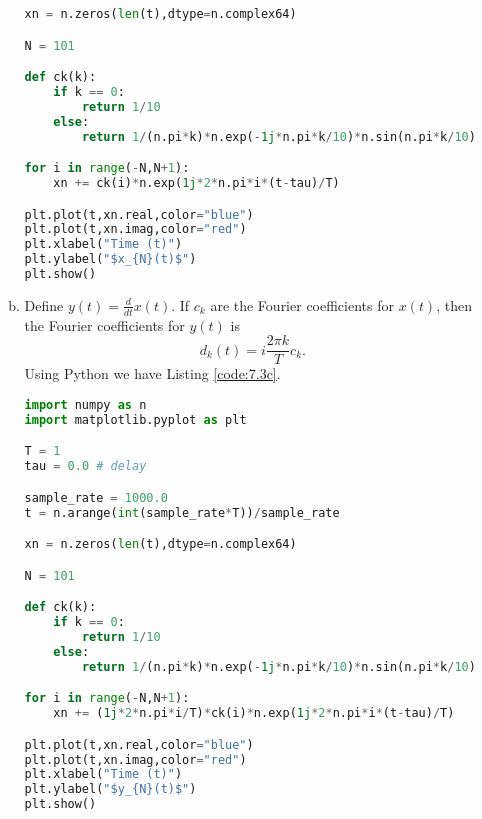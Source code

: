 \begin{enumerate}
\begin{enumerate}[a)]
\begin{lstlisting}[language=Python, caption=Suggested solution to b),label=code:7.3b]
xn = n.zeros(len(t),dtype=n.complex64)

N = 101

def ck(k):
    if k == 0:
        return 1/10
    else:
        return 1/(n.pi*k)*n.exp(-1j*n.pi*k/10)*n.sin(n.pi*k/10)

for i in range(-N,N+1):
    xn += ck(i)*n.exp(1j*2*n.pi*i*(t-tau)/T)

plt.plot(t,xn.real,color="blue")
plt.plot(t,xn.imag,color="red")
plt.xlabel("Time (t)")
plt.ylabel("$x_{N}(t)$")
plt.show()
\end{lstlisting}

\item Define $y(t)=\frac{d}{dt}x(t)$. If $c_{k}$ are the Fourier coefficients for $x(t)$, then the Fourier coefficients for $y(t)$ is
$$d_{k}(t)=i \frac{2\pi k}{T}c_{k}.$$
Using Python we have Listing \ref{code:7.3c}.
\begin{lstlisting}[language=Python, caption=Suggested solution to c),label=code:7.3c]
import numpy as n
import matplotlib.pyplot as plt

T = 1
tau = 0.0 # delay

sample_rate = 1000.0
t = n.arange(int(sample_rate*T))/sample_rate

xn = n.zeros(len(t),dtype=n.complex64)

N = 101

def ck(k):
    if k == 0:
        return 1/10
    else:
        return 1/(n.pi*k)*n.exp(-1j*n.pi*k/10)*n.sin(n.pi*k/10)

for i in range(-N,N+1):
    xn += (1j*2*n.pi*i/T)*ck(i)*n.exp(1j*2*n.pi*i*(t-tau)/T)

plt.plot(t,xn.real,color="blue")
plt.plot(t,xn.imag,color="red")
plt.xlabel("Time (t)")
plt.ylabel("$y_{N}(t)$")
plt.show()
\end{lstlisting}
\end{enumerate}







\end{enumerate}